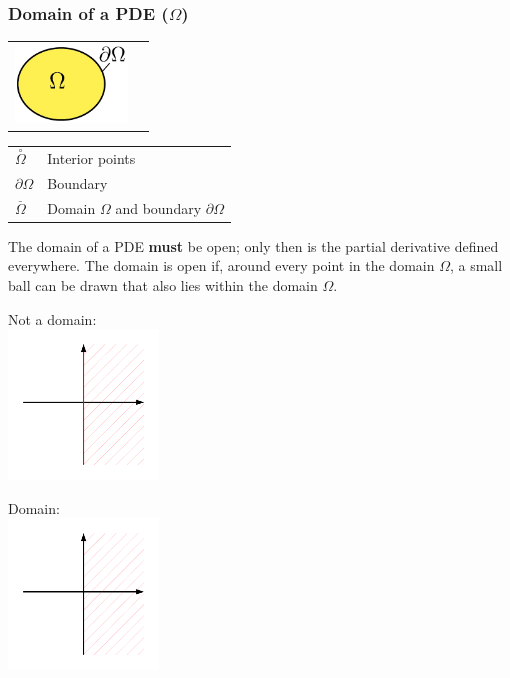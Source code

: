 \subsubsection{Domain of a PDE ($\Omega$)}
\begin{minipage}{4cm}
	\begin{tabular}{ll}
	\includegraphics[width=3cm]{Content/01_theory/Gebiet}&
	\end{tabular}
\end{minipage}
\begin{minipage}{4cm}
	\begin{tabular}{ll}
		$\overset{\circ}{\Omega}$ & Interior points\\
		$\partial\Omega$ & Boundary\\
		$\overset{\_}{\Omega}$ & Domain $\Omega$ and boundary $\partial\Omega$\\
	\end{tabular}
\end{minipage}

The domain of a PDE \textbf{must} be open; only then is the partial derivative defined everywhere. The domain is open if, around every point in the domain $\Omega$, a small ball can be drawn that also lies within the domain $\Omega$.\

\vspace{2mm}

\begin{minipage}{4cm}
Not a domain:\\
\includegraphics[width=4cm]{Content/01_theory/gebiet_1.pdf}\\

\end{minipage}
\begin{minipage}{4cm}
Domain:\\
\includegraphics[width=4cm]{Content/01_theory/gebiet_2.pdf}\\
\end{minipage}

